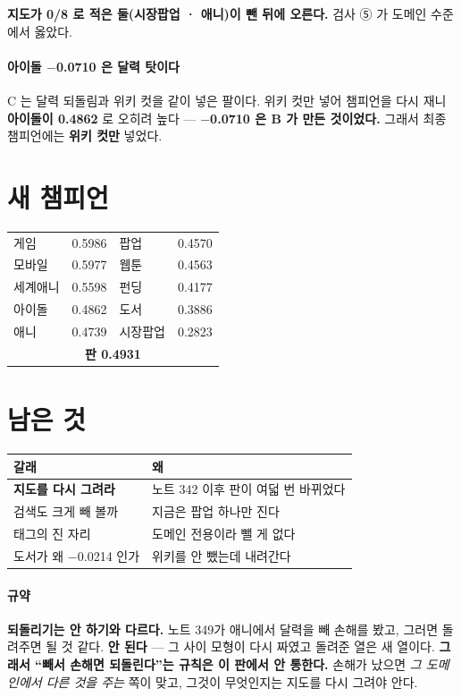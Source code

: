 \documentclass[10pt]{article}
\begin{document}
\textbf{지도가 0/8 로 적은 둘(시장팝업 · 애니)이 뺀 뒤에 오른다.}
검사 ⑤ 가 도메인 수준에서 옳았다.

\paragraph{아이돌 $-$0.0710 은 달력 탓이다} C 는 달력 되돌림과 위키 컷을
같이 넣은 팔이다. 위키 컷만 넣어 챔피언을 다시 재니 \textbf{아이돌이
0.4862} 로 오히려 높다 --- \textbf{$-$0.0710 은 B 가 만든 것이었다.}
그래서 최종 챔피언에는 \textbf{위키 컷만} 넣었다.

\section{새 챔피언}

\begin{center}\footnotesize
\begin{tabular}{lr|lr}
\hline
게임 & 0.5986 & 팝업 & 0.4570 \\
모바일 & 0.5977 & 웹툰 & 0.4563 \\
세계애니 & 0.5598 & 펀딩 & 0.4177 \\
아이돌 & 0.4862 & 도서 & 0.3886 \\
애니 & 0.4739 & 시장팝업 & 0.2823 \\
\hline
\multicolumn{4}{c}{\textbf{판 0.4931}} \\
\hline
\end{tabular}
\end{center}

\section{남은 것}
\begin{center}\footnotesize
\begin{tabular}{ll}
\hline
갈래 & 왜 \\
\hline
\textbf{지도를 다시 그려라} & 노트 342 이후 판이 여덟 번 바뀌었다 \\
검색도 크게 빼 볼까 & 지금은 팝업 하나만 진다 \\
태그의 진 자리 & 도메인 전용이라 뺄 게 없다 \\
도서가 왜 $-$0.0214 인가 & 위키를 안 뺐는데 내려간다 \\
\hline
\end{tabular}
\end{center}

\paragraph{규약} \textbf{되돌리기는 안 하기와 다르다.} 노트 349가 애니에서
달력을 빼 손해를 봤고, 그러면 돌려주면 될 것 같다. \textbf{안 된다} ---
그 사이 모형이 다시 짜였고 돌려준 열은 새 열이다. \textbf{그래서 ``빼서
손해면 되돌린다''는 규칙은 이 판에서 안 통한다.} 손해가 났으면
\emph{그 도메인에서 다른 것을 주는} 쪽이 맞고, 그것이 무엇인지는
지도를 다시 그려야 안다.
\end{document}
